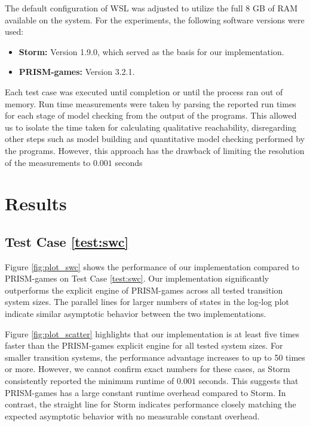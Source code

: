 The default configuration of WSL was adjusted to utilize the full 8 GB of RAM available on the system. For the experiments, the following software versions were used:

\begin{itemize}
    \item \textbf{Storm:} Version 1.9.0, which served as the basis for our implementation.
    \item \textbf{PRISM-games:} Version 3.2.1.
\end{itemize}

Each test case was executed until completion or until the process ran out of memory. Run time measurements were taken by parsing the reported run times for each stage of model checking from the output of the programs. This allowed us to isolate the time taken for calculating qualitative reachability, disregarding other steps such as model building and quantitative model checking performed by the programs. However, this approach has the drawback of limiting the resolution of the measurements to \(0.001\) seconds

\section{Results}
\label{sec:results}



\subsection{Test Case \ref{test:swc}}


Figure \ref{fig:plot_swc} shows the performance of our implementation compared to PRISM-games on Test Case \ref{test:swc}. Our implementation significantly outperforms the explicit engine of PRISM-games across all tested transition system sizes. The parallel lines for larger numbers of states in the log-log plot indicate similar asymptotic behavior between the two implementations.

Figure \ref{fig:plot_scatter} highlights that our implementation is at least five times faster than the PRISM-games explicit engine for all tested system sizes. For smaller transition systems, the performance advantage increases to up to 50 times or more. However, we cannot confirm exact numbers for these cases, as Storm consistently reported the minimum runtime of $0.001$ seconds. This suggests that PRISM-games has a large constant runtime overhead compared to Storm. In contrast, the straight line for Storm indicates performance closely matching the expected asymptotic behavior with no measurable constant overhead.

